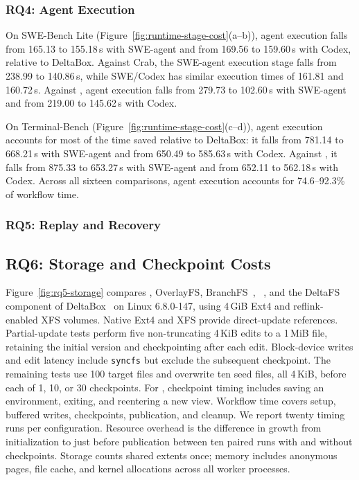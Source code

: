 \subsubsection{RQ4: Agent Execution}
\label{sec:eval-mechanisms}

On SWE-Bench Lite (Figure~\ref{fig:runtime-stage-cost}(a--b)),
agent execution falls from 165.13 to 155.18\,s with SWE-agent and from
169.56 to 159.60\,s with Codex, relative to DeltaBox. Against Crab,
the SWE-agent execution stage falls from 238.99 to 140.86\,s,
while SWE/Codex has similar
execution times of 161.81 and 160.72\,s. Against \trycmd, agent execution
falls from 279.73 to 102.60\,s with SWE-agent and from 219.00 to
145.62\,s with Codex.

On Terminal-Bench (Figure~\ref{fig:runtime-stage-cost}(c--d)),
agent execution accounts for most of the time saved relative to DeltaBox:
it falls from 781.14 to 668.21\,s with SWE-agent and from 650.49 to
585.63\,s with Codex. Against \trycmd, it falls from 875.33 to 653.27\,s
with SWE-agent and from 652.11 to 562.18\,s with Codex.
Across all sixteen comparisons, agent execution
accounts for 74.6--92.3\% of \system workflow time.

\subsubsection{RQ5: Replay and Recovery}
\label{sec:eval-replay}

\subsection{RQ6: Storage and Checkpoint Costs}
\label{sec:eval-file-commit}

Figure~\ref{fig:rq5-storage} compares \system, OverlayFS, BranchFS~\cite{branchfs},
\trycmd~\cite{try-osdi26}, and the DeltaFS component of
DeltaBox~\cite{deltabox} on Linux 6.8.0-147, using 4\,GiB Ext4 and
reflink-enabled XFS volumes.
Native Ext4 and XFS provide direct-update references.
Partial-update tests perform five non-truncating 4\,KiB edits to a
1\,MiB file, retaining the initial version and checkpointing after each
edit. Block-device writes and edit latency include \texttt{syncfs} but
exclude the subsequent checkpoint. The remaining tests use 100 target
files and overwrite ten seed files, all 4\,KiB, before each of 1, 10,
or 30 checkpoints. For \trycmd, checkpoint timing includes saving an
environment, exiting, and reentering a new view.
Workflow time covers setup, buffered writes, checkpoints, publication,
and cleanup. We report twenty timing runs per configuration. Resource
overhead is the difference in growth from initialization to just before
publication between ten paired runs with and without checkpoints.
Storage counts shared extents once; memory includes anonymous pages,
file cache, and kernel allocations across all worker processes.

